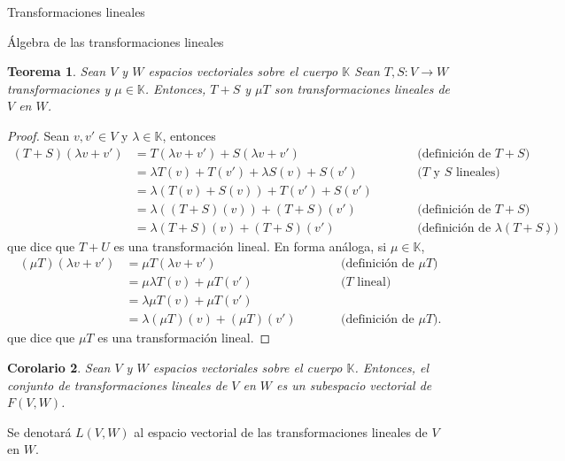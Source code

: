 \documentclass[a4paper,12pt,twoside,spanish,reqno]{amsbook}
\newtheorem{teorema}{Teorema}[section]
\newtheorem{corolario}[teorema]{Corolario}
\theoremstyle{definition}
\theoremstyle{remark}
\newcommand{\K}{\mathbb K}
\begin{document}
\begin{chapter}{Transformaciones lineales}
\begin{section}{Álgebra de las transformaciones lineales}
			\begin{teorema}
				Sean $V$ y $W$ espacios vectoriales sobre el cuerpo $\K$ Sean $T,S : V \to W$ transformaciones y $\mu \in \K$. Entonces, $T + S$ y $\mu T$ son transformaciones lineales de $V$ en $W$.
			\end{teorema}
			\begin{proof}
				Sean $v,v' \in V$ y $\lambda \in \K$, entonces
				\begin{equation*}
				\begin{array}{rlll}
					(T + S)(\lambda v + v') &= T(\lambda v + v') + S(\lambda v + v')&\qquad&\text{(definición de $T+S$)} \\
					&= \lambda T(v) + T(v') + \lambda S(v) + S(v')& &\text{($T$ y $S$ lineales)}\\
					&= \lambda (T(v) +S(v)) + T(v') + S(v')&&\text{}\\
					&= \lambda ((T+S)(v)) + (T + S) (v')& &\text{(definición de $T+S$)}\\
					&= \lambda(T + S)(v) +(T + S) (v')&&\text{(definición de $\lambda(T + S)$)}.
				\end{array}
				\end{equation*}
				que dice que $T + U$ es una transformación lineal. En forma análoga, si $\mu \in \K$, 
				\begin{equation*}
				\begin{array}{rlll}
				(\mu T)(\lambda v + v') &= \mu T(\lambda v + v')&\qquad&\text{(definición de $\mu T$)} \\
				&= \mu \lambda T(v) + \mu T(v') &\qquad&\text{($T$ lineal)}\\
				&=  \lambda \mu T(v) + \mu T(v')&\qquad&\text{}\\
				&= \lambda (\mu T)(v) + (\mu T)(v') &\qquad&\text{(definición de $\mu T$)}.
				\end{array}
				\end{equation*}
				que dice que $\mu T$ es una transformación lineal.
			\end{proof}
			
		\begin{corolario}
			Sean $V$ y $W$ espacios vectoriales sobre el cuerpo $\K$. Entonces, el conjunto de transformaciones lineales de $V$ en $W$ es un subespacio vectorial  de $F(V,W)$. 
		\end{corolario} 	
			
		Se denotará  $L(V,W)$ al espacio vectorial de las transformaciones lineales de $V$ en $W$.
		

\end{section}
\end{chapter}
\end{document}
